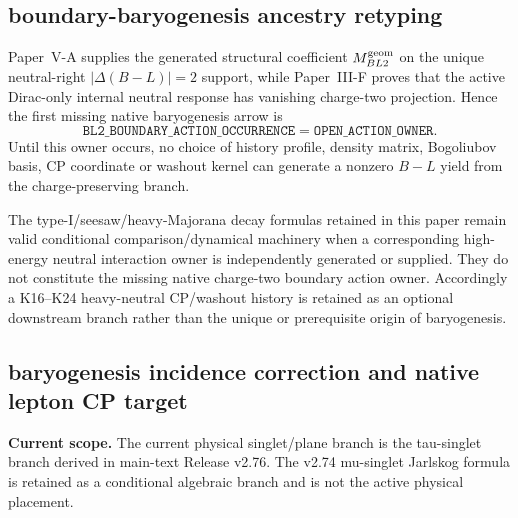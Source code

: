 \documentclass[12pt,a4paper]{article}
\begin{document}
\subsection{boundary-baryogenesis ancestry retyping}
\label{p5c:sec:v270-boundary-baryogenesis-ancestry}

\begin{proposition}
\label{p5c:prop:v270-native-baryogenesis-first-owner}
Paper~V-A supplies the generated structural coefficient
$M_{BL2}^{\rm geom}$ on the unique neutral-right $|\Delta(B-L)|=2$ support,
while Paper~III-F proves that the active Dirac-only internal neutral response
has vanishing charge-two projection.  Hence the first missing native
baryogenesis arrow is
\[
 \boxed{
 \texttt{BL2\_BOUNDARY\_ACTION\_OCCURRENCE}=\texttt{OPEN\_ACTION\_OWNER}.}
\]
Until this owner occurs, no choice of history profile, density matrix,
Bogoliubov basis, CP coordinate or washout kernel can generate a nonzero
$B-L$ yield from the charge-preserving branch.
\end{proposition}

\begin{remark}
\label{p5c:rem:v270-heavy-neutral-conditional-branch}
The type-I/seesaw/heavy-Majorana decay formulas retained in this paper remain
valid conditional comparison/dynamical machinery when a corresponding
high-energy neutral interaction owner is independently generated or supplied.
They do not constitute the missing native charge-two boundary action owner.
Accordingly a K16--K24 heavy-neutral CP/washout history is retained as an
optional downstream branch rather than the unique or prerequisite origin of
baryogenesis.
\end{remark}

\subsection{baryogenesis incidence correction and native lepton CP target}
\label{p5c:sec:v274-baryogenesis-incidence-correction}
\noindent\textbf{Current scope.} The current physical singlet/plane branch is the tau-singlet branch derived in main-text Release v2.76.  The v2.74 mu-singlet Jarlskog formula is retained as a conditional algebraic branch and is not the active physical placement.
\end{document}

